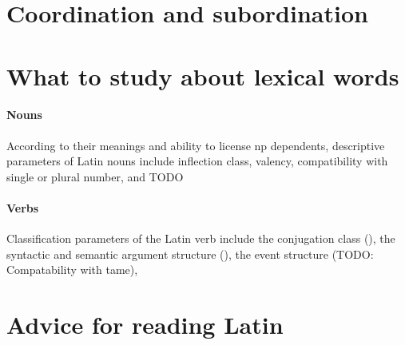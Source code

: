 \documentclass[a4paper, oneside, 12pt]{report}
\begin{document}
\section{Coordination and subordination}

\section{What to study about lexical words}

\paragraph*{Nouns}

According to their meanings and ability to license \acs{np} dependents, 
descriptive parameters of Latin nouns include 
inflection class, valency, compatibility with single or plural number, and TODO

\paragraph*{Verbs}

Classification parameters of the Latin verb include 
the conjugation class (),
the syntactic and semantic argument structure
(), 
the event structure (TODO: Compatability with \acs{tame}),

\section{Advice for reading Latin}
\end{document}

